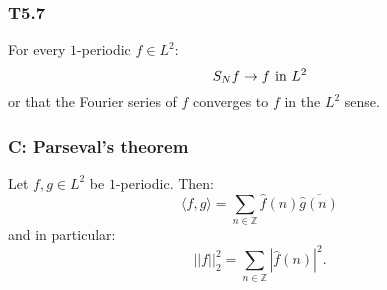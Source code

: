 \documentclass{article}
\begin{document}
\begin{multicols*}{3}
\subsubsection*{T5.7}
For every $1$-periodic $f\in L^2$:
$$S_N f\rightarrow f
\hspace{0.05in}\text{in $L^2$}$$
or that the Fourier series of $f$
converges to $f$ 
in the $L^2$ sense.

\subsubsection*{C: Parseval's theorem}
Let $f,g\in L^2$ be $1$-periodic. Then:
$$\langle f,g\rangle=
\sum_{n\in\mathbb{Z}}\widehat{f}(n)
\overline{\widehat{g}(n)}$$
and in particular:
$$||f||_2^2=\sum_{n\in\mathbb{Z}}
|\widehat{f}(n)|^2.$$

\end{multicols*}
\end{document}
